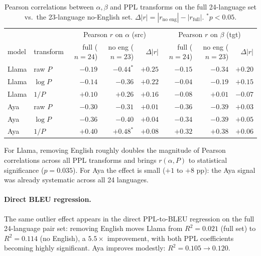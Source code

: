 \documentclass[11pt]{article}
\begin{document}
\begin{table}[h]
\centering
\small
\begin{tabular}{llrrr|rrr}
\toprule
 & & \multicolumn{3}{c|}{Pearson $r$ on $\alpha$ (src)}
   & \multicolumn{3}{c}{Pearson $r$ on $\beta$ (tgt)} \\
model & transform & full ($n=24$) & no eng ($n=23$) & $\Delta |r|$
                  & full ($n=24$) & no eng ($n=23$) & $\Delta |r|$ \\
\midrule
Llama & raw $P$  & $-0.19$ & $\mathbf{-0.44^*}$ & $+0.25$
              & $-0.15$ & $-0.34$              & $+0.20$ \\
Llama & $\log P$ & $-0.14$ & $-0.36$            & $+0.22$
              & $-0.04$ & $-0.19$              & $+0.15$ \\
Llama & $1/P$    & $+0.10$ & $+0.26$            & $+0.16$
              & $-0.08$ & $+0.01$              & $-0.07$ \\
Aya   & raw $P$  & $-0.30$ & $-0.31$            & $+0.01$
              & $-0.36$ & $-0.39$              & $+0.03$ \\
Aya   & $\log P$ & $-0.36$ & $-0.40$            & $+0.04$
              & $-0.34$ & $-0.39$              & $+0.05$ \\
Aya   & $1/P$    & $+0.40$ & $\mathbf{+0.48^*}$ & $+0.08$
              & $+0.32$ & $+0.38$              & $+0.06$ \\
\bottomrule
\end{tabular}
\caption{Pearson correlations between $\alpha, \beta$ and PPL
transforms on the full 24-language set vs.\ the 23-language no-English
set. $\Delta |r| = |r_{\text{no eng}}| - |r_{\text{full}}|$.
$^{*}p < 0.05$.}
\label{tab:eng-effect}
\end{table}

For Llama, removing English roughly doubles the magnitude of Pearson
correlations across all PPL transforms and brings $r(\alpha, P)$ to
statistical significance ($p = 0.035$). For Aya the effect is small
($+1$ to $+8$ pp): the Aya signal was already systematic across all
24 languages.

\paragraph{Direct BLEU regression.}
The same outlier effect appears in the direct PPL-to-BLEU regression
on the full 24-language pair set: removing English moves Llama from
$R^2 = 0.021$ (full set) to $R^2 = 0.114$ (no English), a
$5.5\times$ improvement, with both PPL coefficients becoming highly
significant. Aya improves modestly: $R^2 = 0.105 \to 0.120$.
\end{document}
